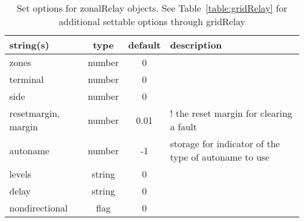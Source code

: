 \begin{table}[ht]
\centering
\begin{tabular}{p{5cm} c c p{7cm}}
\hline
string(s) & type & default & description \\
\hline
zones & number & 0 & \\
terminal & number & 0 & \\
side & number & 0 & \\
resetmargin, margin & number & 0.01 & ! the reset margin for clearing a fault\\
autoname & number & -1 & storage for indicator of the type of autoname to use\\
levels & string & 0 & \\
delay & string & 0 & \\
nondirectional & flag & 0 & \\
\hline
\end{tabular}
\caption{Set options for zonalRelay objects. See Table~\ref{table:gridRelay} for additional settable options through gridRelay}
\label{table:zonalRelay}
\end{table}
